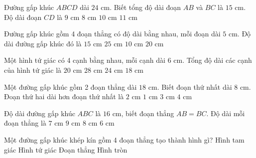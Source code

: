 \begin{ex} %
Đường gấp khúc $ABCD$ dài $24\text{ cm}$. Biết tổng độ dài đoạn $AB$ và $BC$ là $15\text{ cm}$. Độ dài đoạn $CD$ là
\choice
{\True $9\text{ cm}$}
{$8\text{ cm}$}
{$10\text{ cm}$}
{$11\text{ cm}$}
\end{ex}

\begin{ex} %
Đường gấp khúc gồm 4 đoạn thẳng có độ dài bằng nhau, mỗi đoạn dài $5\text{ cm}$. Độ dài đường gấp khúc đó là
\choice
{$15\text{ cm}$}
{$25\text{ cm}$}
{$10\text{ cm}$}
{\True $20\text{ cm}$}
\end{ex}

\begin{ex} %
Một hình tứ giác có 4 cạnh bằng nhau, mỗi cạnh dài $6\text{ cm}$. Tổng độ dài các cạnh của hình tứ giác là
\choice
{$20\text{ cm}$}
{$28\text{ cm}$}
{\True $24\text{ cm}$}
{$18\text{ cm}$}
\end{ex}

\begin{ex} %
Một đường gấp khúc gồm 2 đoạn thẳng dài $18\text{ cm}$. Biết đoạn thứ nhất dài $8\text{ cm}$. Đoạn thứ hai dài hơn đoạn thứ nhất là
\choice
{\True $2\text{ cm}$}
{$1\text{ cm}$}
{$3\text{ cm}$}
{$4\text{ cm}$}
\end{ex}

\begin{ex} %
Độ dài đường gấp khúc $ABC$ là $16\text{ cm}$, biết đoạn thẳng $AB = BC$. Độ dài mỗi đoạn thẳng là
\choice
{$7\text{ cm}$}
{$9\text{ cm}$}
{\True $8\text{ cm}$}
{$6\text{ cm}$}
\end{ex}

\begin{ex} %
Một đường gấp khúc khép kín gồm 4 đoạn thẳng tạo thành hình gì?
\choice
{Hình tam giác}
{\True Hình tứ giác}
{Đoạn thẳng}
{Hình tròn}
\end{ex}

